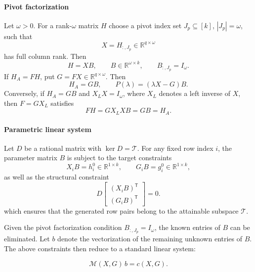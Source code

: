 \documentclass[journal]{IEEEtran}
\theoremstyle{plainn}
\theoremstyle{remark}
\begin{document}
\paragraph*{Pivot factorization}\label{sec:pivot}
Let $\omega>0$. For a rank-$\omega$ matrix $H$ choose a pivot index set
$J_{p}\subseteq[k]$, $|J_{p}|=\omega$, such that
\begin{equation*}
X=H_{:,J_{p}}\in\mathbb R^{q\times\omega}
\end{equation*}
has full column rank. Then
\begin{equation*}
H=XB,\qquad B\in\mathbb R^{\omega\times k},\qquad B_{:,J_p}=I_\omega .
\end{equation*}
If $H_A=FH$, put $G=FX\in\mathbb R^{q\times\omega}$.
Then
\begin{equation}
H_A=GB,\qquad P(\lambda)=(\lambda X-G)B .
\end{equation}
Conversely, if $H_A=GB$ and $X_LX=I_\omega$, where $X_L$ denotes a left
inverse of $X$, then $F=GX_L$ satisfies
\begin{equation}
FH=GX_LXB=GB=H_A .
\end{equation}

\paragraph*{Parametric linear system}\label{sec:param}
Let $D$ be a rational matrix with $\ker D=\mathcal T$. For any fixed row index 
$i$, the parameter matrix $B$ is subject to the target constraints
\begin{equation*}
X_iB=h_i^0\in\mathbb R^{1\times k},\qquad G_iB=g_i^0\in\mathbb R^{1\times k},
\end{equation*}
as well as the structural constraint
\begin{equation}
D\begin{bmatrix}(X_iB)^{\mathsf T}\\ (G_iB)^{\mathsf T}\end{bmatrix}=0.
\end{equation}
which ensures that the generated row pairs belong to the attainable subspace $\mathcal T$.

Given the pivot factorization condition $B_{:,J_p}=I_\omega$, the known entries of 
$B$ can be eliminated. Let $b$ denote the vectorization of the remaining unknown entries of $B$. The above constraints then reduce to a standard linear system:


\begin{equation}
\mathcal M(X,G)\,b=c(X,G).
\end{equation}
\end{document}
